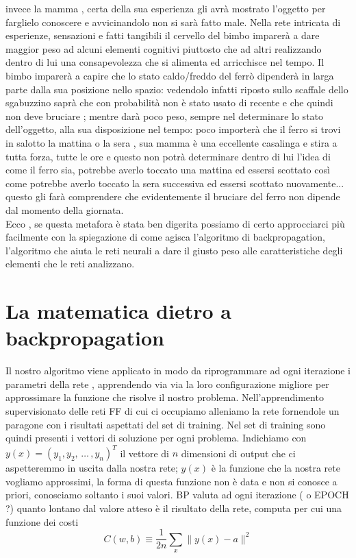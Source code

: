 invece la mamma , certa della sua esperienza gli avrà mostrato l'oggetto per farglielo conoscere e avvicinandolo non si sarà fatto male. Nella rete intricata di esperienze, sensazioni e fatti tangibili il cervello del bimbo imparerà a dare maggior peso ad alcuni elementi cognitivi piuttosto che ad altri realizzando dentro di lui una consapevolezza che si alimenta ed arricchisce nel tempo. Il bimbo imparerà a capire che lo stato caldo/freddo del ferrò dipenderà in larga parte dalla sua posizione nello spazio: vedendolo infatti riposto sullo scaffale dello sgabuzzino saprà che con probabilità non è stato usato di recente e che quindi non deve bruciare ; mentre darà poco peso, sempre nel determinare lo stato dell'oggetto, alla sua disposizione nel tempo: poco importerà che il ferro si trovi in salotto la mattina o la sera , sua mamma è una eccellente casalinga e stira a tutta forza, tutte le ore e questo non potrà determinare dentro di lui l'idea di come il ferro sia, potrebbe averlo toccato una mattina ed essersi scottato così come potrebbe averlo toccato la sera successiva ed essersi scottato nuovamente... questo gli farà comprendere che evidentemente il bruciare del ferro non dipende dal momento della giornata. 
\\
Ecco , se questa metafora è stata ben digerita possiamo di certo approcciarci più facilmente con la spiegazione di come agisca l'algoritmo di backpropagation, l'algoritmo che aiuta le reti neurali a dare il giusto peso alle caratteristiche degli elementi che le reti analizzano. 
\section*{La matematica dietro a backpropagation}
Il nostro algoritmo viene applicato in modo da riprogrammare ad ogni iterazione i parametri della rete , apprendendo via via la loro configurazione migliore per approssimare la funzione che risolve il nostro problema. Nell'apprendimento supervisionato delle reti FF di cui ci occupiamo alleniamo la rete fornendole un paragone con i risultati aspettati del set di training. Nel set di training sono quindi presenti i vettori di soluzione per ogni problema. Indichiamo con $ y(x)=(y_{1}, y_{2},\, \dots \, , y_{n})^{T} $ il vettore di $n$ dimensioni di output che ci aspetteremmo in uscita dalla  nostra rete; $y(x)$ è la funzione che la nostra rete vogliamo approssimi, la forma di questa funzione non è data e non si conosce a priori, conosciamo soltanto i suoi valori. BP valuta ad ogni iterazione ( o EPOCH ?) quanto lontano dal valore atteso è il risultato della rete, computa per cui una funzione dei costi
\begin{equation}
	C(w,b)\equiv\frac{1}{2n}\sum_{x} \parallel y(x)-a\parallel^{2}
\end{equation} 


